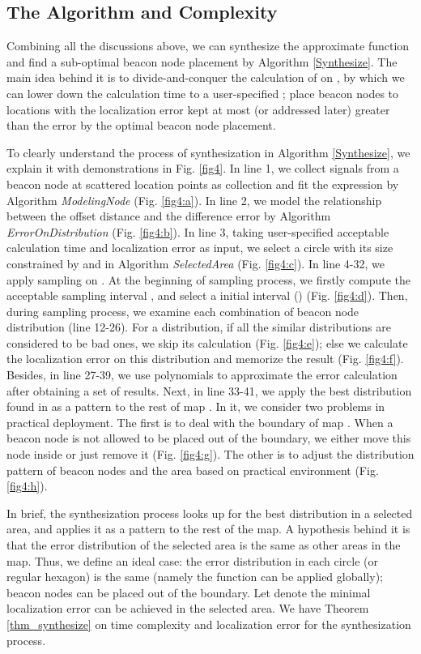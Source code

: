 \documentclass[10pt, conference, letterpaper]{IEEEtran}
\begin{document}
\subsection{The Algorithm and Complexity} \label{synthesize_f}
Combining all the discussions above, we can synthesize the approximate function  and find a sub-optimal beacon node placement by Algorithm \ref{Synthesize}. The main idea behind it is to divide-and-conquer the calculation of  on , by which we can lower down the calculation time to a user-specified ; place beacon nodes to locations  with the localization error kept at most  (or  addressed later) greater than the error by the optimal beacon node placement.

To clearly understand the process of synthesization in Algorithm \ref{Synthesize}, we explain it with demonstrations in Fig. \ref{fig4}. In line 1, we collect signals from a beacon node at scattered location points as collection  and fit the expression  by Algorithm \textit{ModelingNode} (Fig. \ref{fig4:a}). In line 2, we model the relationship  between the offset distance  and the difference error  by Algorithm \textit{ErrorOnDistribution} (Fig. \ref{fig4:b}). In line 3, taking user-specified acceptable calculation time  and localization error  as input, we select a circle  with its size constrained by  and  in Algorithm \textit{SelectedArea} (Fig. \ref{fig4:c}). In line 4-32, we apply sampling on . At the beginning of  sampling process, we firstly compute the acceptable sampling interval , and select a initial interval  () (Fig. \ref{fig4:d}). Then, during sampling process, we examine each combination of beacon node distribution (line 12-26). For a distribution, if all the similar distributions are considered to be bad ones, we skip its calculation (Fig. \ref{fig4:e}); else we calculate the localization error on this distribution and memorize the result (Fig. \ref{fig4:f}). Besides, in line 27-39, we use polynomials to approximate the error calculation after obtaining a set of results. Next, in line 33-41, we apply the best distribution found in  as a pattern to the rest of map . In it, we consider two problems in practical deployment. The first is to deal with the boundary of map . When a beacon node is not allowed to be placed out of the boundary, we either move this node inside or just remove it (Fig. \ref{fig4:g}). The other is to adjust the distribution pattern of beacon nodes and the area based on practical environment (Fig. \ref{fig4:h}).

In brief, the synthesization process looks up for the best distribution in a selected area, and applies it as a pattern to the rest of the map. A hypothesis behind it is that the error distribution of the selected area is the same as other areas in the map. Thus, we define an ideal case: the error distribution in each circle (or regular hexagon) is the same (namely the function  can be applied globally); beacon nodes can be placed out of the boundary. Let  denote the minimal localization error can be achieved in the selected area. We have Theorem \ref{thm_synthesize} on time complexity and localization error for the synthesization process.
\end{document}
